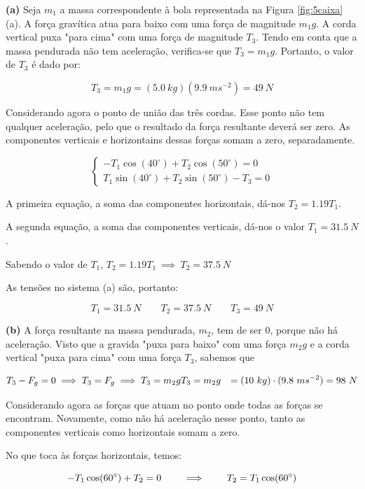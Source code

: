 \textbf{(a)} Seja $m_1$ a massa correspondente à bola representada na Figura \ref{fig:5caixa} (a). A força gravítica atua para baixo com uma força de magnitude $m_1g$. A corda vertical puxa "para cima" com uma força de magnitude $T_3$. Tendo em conta que a massa pendurada não tem aceleração, verifica-se que $T_3=m_1g$. Portanto, o valor de $T_3$ é dado por:

$$
T_3=m_1g=(5.0\ kg)(9.9\ ms^{-2})=49\ N
$$

Considerando agora o ponto de união das três cordas. Esse ponto não tem qualquer aceleração, pelo que o resultado da força resultante deverá ser zero. As componentes verticais e horizontains dessas forças somam a zero, separadamente.

$$
    \begin{cases}
        -T_1\cos(40^{\circ})+T_2\cos(50^{\circ})=0 \\
        T_1\sin(40^{\circ})+T_2\sin(50^{\circ})-T_3=0
    \end{cases}
$$

A primeira equação, a soma das componentes horizontais, dá-nos $T_2=1.19T_1$.

A segunda equação,  a soma das componentes verticais, dá-nos o valor  $T_1=31.5\ N$.

Sabendo o valor de $T_1$, $T_2=1.19T_1\ \implies \ T_2=37.5\ N$

As tensões no sistema (a) são, portanto:

$$
T_1=31.5\ N \qquad T_2=37.5\ N \qquad T_3=49\ N
$$

\textbf{(b)} A força resultante na massa pendurada, $m_2$, tem de ser 0, porque não há aceleração. Visto que a gravida "puxa para baixo" com uma força $m_2g$ e a corda vertical "puxa para cima" com uma força $T_3$, sabemos que

$$
T_3-F_g=0 \implies T_3=F_g \implies T_3=m_2g \\
\begin{aligned}
    T_3&=m_2g
    &=(10\ kg)\cdot(9.8\ ms^{-2})=98\ N
\end{aligned}
$$

Considerando agora as forças que atuam no ponto onde todas as forças se encontram. Novamente, como não há aceleração nesse ponto, tanto as componentes verticais como horizontais somam a zero.

No que toca às forças horizontais, temos:

$$
-T_1\cos(60^{\circ})+T_2=0 \qquad \implies \qquad T_2=T_1\cos(60^{\circ}) \\
$$

